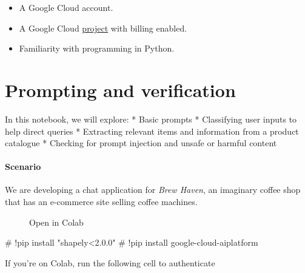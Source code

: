 \documentclass[
  letterpaper,
  DIV=11,
  numbers=noendperiod]{scrreprt}
\newenvironment{Shaded}{\begin{snugshade}}{\end{snugshade}}
\newcommand{\CommentTok}[1]{\textcolor[rgb]{0.37,0.37,0.37}{#1}}
\providecommand{\tightlist}{%
  \setlength{\itemsep}{0pt}\setlength{\parskip}{0pt}}\usepackage{longtable,booktabs,array}
\begin{document}
\begin{itemize}
\tightlist
\item
  A Google Cloud account.
\item
  A Google Cloud
  \href{https://cloud.google.com/resource-manager/docs/creating-managing-projects}{project}
  with billing enabled.
\item
  Familiarity with programming in Python.
\end{itemize}


\hypertarget{prompting-and-verification}{%
\chapter{Prompting and verification}\label{prompting-and-verification}}

In this notebook, we will explore: * Basic prompts * Classifying user
inputs to help direct queries * Extracting relevant items and
information from a product catalogue * Checking for prompt injection and
unsafe or harmful content

\hypertarget{scenario}{%
\subsubsection{Scenario}\label{scenario}}

We are developing a chat application for \emph{Brew Haven}, an imaginary
coffee shop that has an e-commerce site selling coffee machines.

\begin{figure}

{\centering 

\href{https://colab.research.google.com/github/rastringer/building_apps_with_genai_studio/blob/main/1_prompting_and_verification.ipynb}{}

}

\caption{Open in Colab}

\end{figure}

\begin{Shaded}
\begin{Highlighting}[]
\CommentTok{\# !pip install "shapely\textless{}2.0.0"}
\CommentTok{\# !pip install google{-}cloud{-}aiplatform}
\end{Highlighting}
\end{Shaded}

If you're on Colab, run the following cell to authenticate
\end{document}
